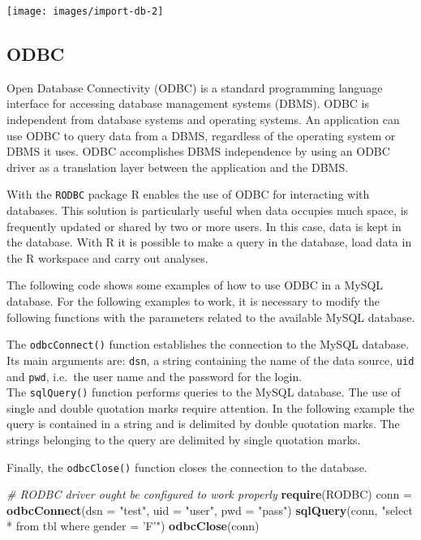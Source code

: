 \documentclass[]{book}
\newenvironment{Shaded}{\begin{snugshade}}{\end{snugshade}}
\newcommand{\KeywordTok}[1]{\textcolor[rgb]{0.13,0.29,0.53}{\textbf{{#1}}}}
\newcommand{\DataTypeTok}[1]{\textcolor[rgb]{0.13,0.29,0.53}{{#1}}}
\newcommand{\StringTok}[1]{\textcolor[rgb]{0.31,0.60,0.02}{{#1}}}
\newcommand{\CommentTok}[1]{\textcolor[rgb]{0.56,0.35,0.01}{\textit{{#1}}}}
\newcommand{\NormalTok}[1]{{#1}}
\begin{document}
\texttt{[image: images/import-db-2]}

\subsection{ODBC}\label{odbc}

Open Database Connectivity (ODBC) is a standard programming language
interface for accessing database management systems (DBMS). ODBC is
independent from database systems and operating systems. An application
can use ODBC to query data from a DBMS, regardless of the operating
system or DBMS it uses. ODBC accomplishes DBMS independence by using an
ODBC driver as a translation layer between the application and the DBMS.

With the \texttt{RODBC} package R enables the use of ODBC for
interacting with databases. This solution is particularly useful when
data occupies much space, is frequently updated or shared by two or more
users. In this case, data is kept in the database. With R it is possible
to make a query in the database, load data in the R workspace and carry
out analyses.

The following code shows some examples of how to use ODBC in a MySQL
database. For the following examples to work, it is necessary to modify
the following functions with the parameters related to the available
MySQL database.

The \texttt{odbcConnect()} function establishes the connection to the
MySQL database. Its main arguments are: \texttt{dsn}, a string
containing the name of the data source, \texttt{uid} and \texttt{pwd},
i.e.~the user name and the password for the login.\\
The \texttt{sqlQuery()} function performs queries to the MySQL database.
The use of single and double quotation marks require attention. In the
following example the query is contained in a string and is delimited by
double quotation marks. The strings belonging to the query are delimited
by single quotation marks.

Finally, the \texttt{odbcClose()} function closes the connection to the
database.

\begin{Shaded}
\begin{Highlighting}[]
\CommentTok{# RODBC driver ought be configured to work properly}
\KeywordTok{require}\NormalTok{(RODBC)}
\NormalTok{conn =}\StringTok{ }\KeywordTok{odbcConnect}\NormalTok{(}\DataTypeTok{dsn =} \StringTok{"test"}\NormalTok{, }\DataTypeTok{uid =} \StringTok{"user"}\NormalTok{, }\DataTypeTok{pwd =} \StringTok{"pass"}\NormalTok{)}
\KeywordTok{sqlQuery}\NormalTok{(conn, }\StringTok{"select * from tbl where gender = 'F'"}\NormalTok{) }
\KeywordTok{odbcClose}\NormalTok{(conn)}
\end{Highlighting}
\end{Shaded}
\end{document}

